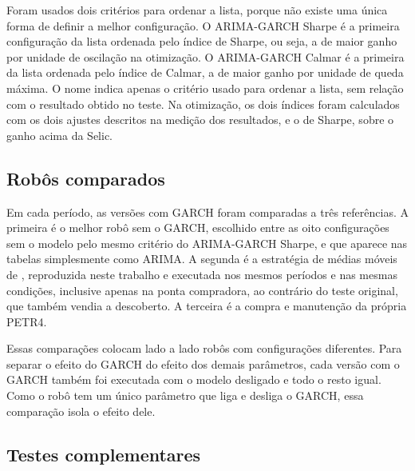Foram usados dois critérios para ordenar a lista, porque não existe uma única
forma de definir a melhor configuração. O ARIMA-GARCH Sharpe é a primeira
configuração da lista ordenada pelo índice de Sharpe, ou seja, a de maior ganho
por unidade de oscilação na otimização. O ARIMA-GARCH Calmar é a primeira da lista
ordenada pelo índice de Calmar, a de maior ganho por unidade de queda máxima. O
nome indica apenas o critério usado para ordenar a lista, sem relação com o
resultado obtido no teste. Na otimização, os dois índices foram calculados com os dois ajustes
descritos na medição dos resultados, e o de Sharpe, sobre o ganho acima da Selic.

\subsection{Robôs comparados}

Em cada período, as versões com GARCH foram comparadas a três referências. A
primeira é o melhor robô sem o GARCH, escolhido entre as oito configurações sem o
modelo pelo mesmo critério do ARIMA-GARCH Sharpe, e que aparece nas tabelas
simplesmente como ARIMA. A segunda é a estratégia de médias móveis de
, reproduzida neste trabalho e executada nos mesmos
períodos e nas mesmas condições, inclusive apenas na ponta compradora, ao
contrário do teste original, que também vendia a descoberto. A terceira é a
compra e manutenção da própria PETR4.

Essas comparações colocam lado a lado robôs com configurações diferentes. Para
separar o efeito do GARCH do efeito dos demais parâmetros, cada
versão com o GARCH também foi executada com o modelo desligado e todo o resto
igual. Como o robô tem um único parâmetro que liga e desliga o GARCH, essa
comparação isola o efeito dele.

\subsection{Testes complementares}
\label{sec:complementar}

